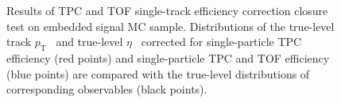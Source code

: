 \begin{figure}[h]
{\begin{subfigure}[b]{\linewidth}
  \end{subfigure}
}%
\caption[Results of TPC and TOF single-track efficiency correction closure test on embedded signal MC sample.]{Results of TPC and TOF single-track efficiency correction closure test on embedded signal MC sample. Distributions of the true-level track $p_{\text{T}}$~ and true-level $\eta$~ corrected for single-particle TPC efficiency (red points) and single-particle TPC and TOF efficiency (blue points) are compared with the true-level distributions of corresponding observables (black points). }\label{fig:closureTestTpcTofSingleTrk}%
\end{figure}

\begin{figure}[h]
\centering
\parbox{0.4725\textwidth}{
  \centering
  \begin{subfigure}[b]{\linewidth}
  \end{subfigure}\\
  \begin{subfigure}[b]{\linewidth}\addtocounter{subfigure}{1}

\end{subfigure}}
\end{figure}
